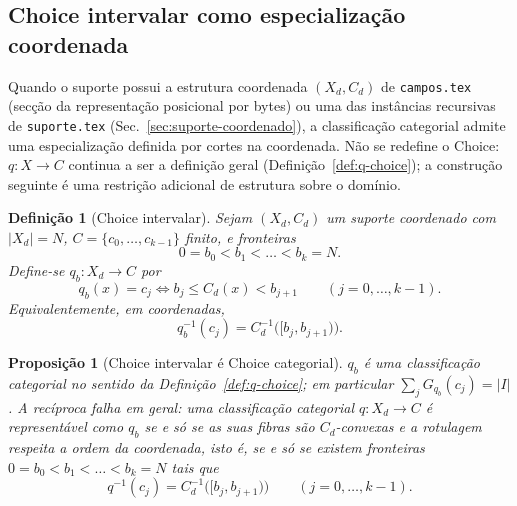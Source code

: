 \documentclass[11pt,a4paper]{article}
\newtheorem{definicao}{Definição}
\newtheorem{proposicao}{Proposição}
\begin{document}
\subsection{Choice intervalar como especialização coordenada}
\label{sec:choice-intervalar}

Quando o suporte possui a estrutura coordenada \((X_d,C_d)\) de
\texttt{campos.tex} (secção da representação posicional por bytes) ou uma das
instâncias recursivas de \texttt{suporte.tex} (Sec.~\ref{sec:suporte-coordenado}),
a classificação categorial admite uma especialização definida por cortes na
coordenada. Não se redefine o
Choice: \(q\colon X\to C\) continua a ser a definição geral
(Definição~\ref{def:q-choice}); a construção seguinte é uma restrição adicional
de estrutura sobre o domínio.

\begin{definicao}[Choice intervalar]
\label{def:choice-intervalar}
Sejam \((X_d,C_d)\) um suporte coordenado com \(\lvert X_d\rvert=N\),
\(C=\{c_0,\dots,c_{k-1}\}\) finito, e fronteiras
\[
0=b_0<b_1<\dots<b_k=N.
\]
Define-se \(q_b\colon X_d\to C\) por
\[
q_b(x)=c_j\iff b_j\le C_d(x)<b_{j+1}\qquad(j=0,\dots,k-1).
\]
Equivalentemente, em coordenadas,
\[
q_b^{-1}(c_j)=C_d^{-1}\bigl([b_j,b_{j+1})\bigr).
\]
\end{definicao}

\begin{proposicao}[Choice intervalar é Choice categorial]
\label{prop:choice-intervalar-fibra}
\(q_b\) é uma classificação categorial no sentido da
Definição~\ref{def:q-choice}; em particular \(\sum_j G_{q_b}(c_j)=\lvert I\rvert\).
A recíproca falha em geral: uma classificação categorial \(q\colon X_d\to C\)
é representável como \(q_b\) se e só se as suas fibras são \(C_d\)-convexas
\emph{e} a rotulagem respeita a ordem da coordenada, isto é, se e só se
existem fronteiras \(0=b_0<b_1<\dots<b_k=N\) tais que
\[
q^{-1}(c_j)=C_d^{-1}\bigl([b_j,b_{j+1})\bigr)
\qquad(j=0,\dots,k-1).
\]
\end{proposicao}
\end{document}
